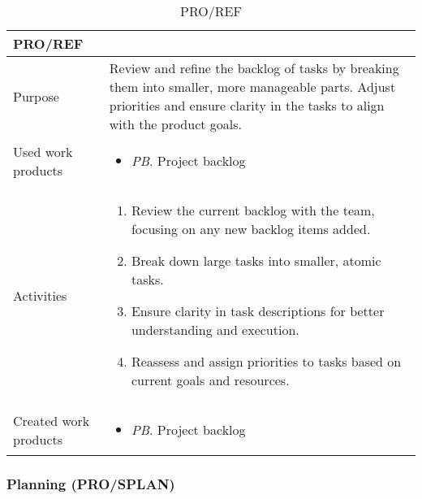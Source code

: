 \begin{table}[h!]
\begin{tabular}{l|p{}}
\hline
\textbf{PRO/REF}        & \textbf{} \\ \hline
Purpose & Review and refine the backlog of tasks by breaking them into smaller, more manageable parts. Adjust priorities and ensure clarity in the tasks to align with the product goals. \\ \hline
Used work products    &      
\begin{itemize}
    \item \textit{PB}. Project backlog
\end{itemize}
\\ \hline
Activities            &   
\begin{enumerate}
    \item Review the current backlog with the team, focusing on any new backlog items added.
    \item Break down large tasks into smaller, atomic tasks.
    \item Ensure clarity in task descriptions for better understanding and execution.
    \item Reassess and assign priorities to tasks based on current goals and resources.
\end{enumerate}
\\ \hline
Created work products &     
\begin{itemize}
    \item \textit{PB}. Project backlog
\end{itemize}
\end{tabular}
\caption{PRO/REF}
\label{PRO/REF}
\end{table}

\newpage
\subsubsection{Planning (PRO/SPLAN)}


